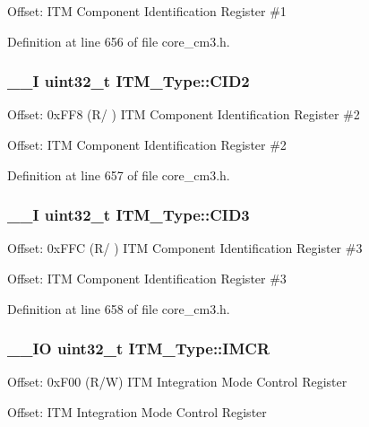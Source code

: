Offset\-: I\-T\-M Component Identification Register \#1 

Definition at line 656 of file core\-\_\-cm3.\-h.

\hypertarget{struct_i_t_m___type_adee4ccce1429db8b5db3809c4539f876}{
\subsubsection[{C\-I\-D2}]{\setlength{\rightskip}{0pt plus 5cm}\-\_\-\-\_\-\-I {\bf uint32\-\_\-t} I\-T\-M\-\_\-\-Type\-::\-C\-I\-D2}}\label{struct_i_t_m___type_adee4ccce1429db8b5db3809c4539f876}
Offset\-: 0x\-F\-F8 (R/ ) I\-T\-M Component Identification Register \#2

Offset\-: I\-T\-M Component Identification Register \#2 

Definition at line 657 of file core\-\_\-cm3.\-h.

\hypertarget{struct_i_t_m___type_a0e7aa199619cc7ac6baddff9600aa52e}{
\subsubsection[{C\-I\-D3}]{\setlength{\rightskip}{0pt plus 5cm}\-\_\-\-\_\-\-I {\bf uint32\-\_\-t} I\-T\-M\-\_\-\-Type\-::\-C\-I\-D3}}\label{struct_i_t_m___type_a0e7aa199619cc7ac6baddff9600aa52e}
Offset\-: 0x\-F\-F\-C (R/ ) I\-T\-M Component Identification Register \#3

Offset\-: I\-T\-M Component Identification Register \#3 

Definition at line 658 of file core\-\_\-cm3.\-h.

\hypertarget{struct_i_t_m___type_ab2e87d8bb0e3ce9b8e0e4a6a6695228a}{
\subsubsection[{I\-M\-C\-R}]{\setlength{\rightskip}{0pt plus 5cm}\-\_\-\-\_\-\-I\-O {\bf uint32\-\_\-t} I\-T\-M\-\_\-\-Type\-::\-I\-M\-C\-R}}\label{struct_i_t_m___type_ab2e87d8bb0e3ce9b8e0e4a6a6695228a}
Offset\-: 0x\-F00 (R/\-W) I\-T\-M Integration Mode Control Register

Offset\-: I\-T\-M Integration Mode Control Register 

